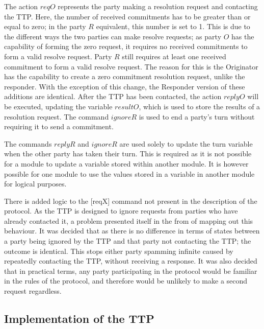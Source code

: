 \documentclass{l4proj}
\begin{document}
The action $reqO$ represents the party making a resolution request and contacting the TTP. Here, the number of received commitments has to be greater than or equal to zero; in the party $R$ equivalent, this number is set to 1. This is due to the different ways the two parties can make resolve requests; as party $O$ has the capability of forming the zero request, it requires no received commitments to form a valid resolve request. Party $R$ still requires at least one received commitment to form a valid resolve request. The reason for this is the Originator has the capability to create a zero commitment resolution request, unlike the responder. With the exception of this change, the Responder version of these additions are identical. After the TTP has been contacted, the action $replyO$ will be executed, updating the variable $resultO$, which is used to store the results of a resolution request. The command $ignoreR$ is used to end a party's turn without requiring it to send a commitment.

The commands $replyR$ and $ignoreR$ are used solely to update the turn variable when the other party has taken their turn. This is required as it is not possible for a module to update a variable stored within another module. It is however possible for one module to use the values stored in a variable in another module for logical purposes.

There is added logic to the [reqX] command not present in the description of the protocol. As the TTP is designed to ignore requests from parties who have already contacted it, a problem presented itself in the from of mapping out this behaviour. It was decided that as there is no difference in terms of states between a party being ignored by the TTP and that party not contacting the TTP; the outcome is identical. This stops either party spamming infinite caused by repeatedly contacting the TTP, without receiving a response. It was also decided that in practical terms, any party participating in the protocol would be familiar in the rules of the protocol, and therefore would be unlikely to make a second request regardless.\\


\subsection{Implementation of the TTP}
\end{document}
